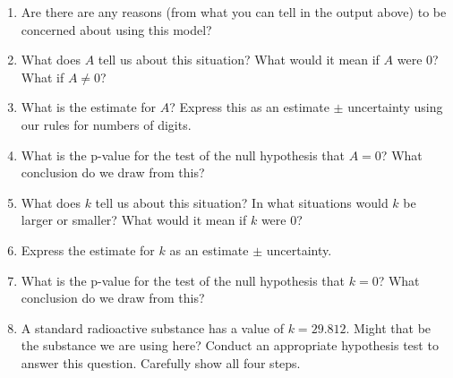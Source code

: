 \documentclass[twoside]{book}\usepackage[]{graphicx}\usepackage[]{xcolor}
\newenvironment{knitrout}{}{} %
\begin{document}
\begin{problem}
\begin{knitrout}
{}



\end{knitrout}
\begin{enumerate}
	\item
		Are there are any reasons (from what you can tell in the output
		above) to be concerned about using this model?
	\item
		What does $A$ tell us about this situation?  
		What would it mean if $A$ were 0?  What if $A \neq 0$?
\item
	What is the estimate for $A$?  Express this as an estimate $\pm$ uncertainty
	using our rules for numbers of digits.
\item
	What is the p-value for the test of the null hypothesis that $A = 0$?
	What conclusion do we draw from this?
\item
	What does $k$ tell us about this situation?  In what situations would $k$
	be larger or smaller?  What would it mean if $k$ were 0?

	\item
		Express the estimate for $k$ as an estimate $\pm$ uncertainty.
\item
	What is the p-value for the test of the null hypothesis that $k = 0$?
	What conclusion do we draw from this?
\item
A standard radioactive substance has a value of $k = 29.812$.  Might that be the
substance we are using here?  Conduct an appropriate hypothesis test to answer
this question.  Carefully show all four steps.
\end{enumerate}
\end{problem}
\end{document}
